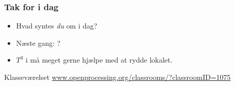 \documentclass{beamer}
\begin{document}
\begin{frame}
  \frametitle{Tak for i dag}

  \begin{itemize}
  \item Hvad syntes \emph{du} om i dag?
  \item Næste gang: ?
  \item $T^3$ i må meget gerne hjælpe med at rydde lokalet.
  \end{itemize}

  \begin{block}{Klasseværelset}
    \url{www.openprocessing.org/classrooms/?classroomID=1075}
  \end{block}

\end{frame}
\end{document}
